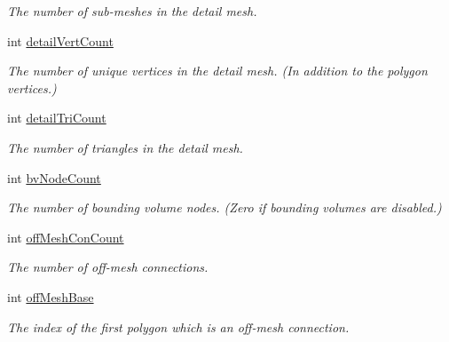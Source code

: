 \begin{DoxyCompactItemize}
\begin{DoxyCompactList}\small\item\em The number of sub-\/meshes in the detail mesh. \end{DoxyCompactList}\item 
\mbox{\label{structdtMeshHeader_abe1c10b7e925b0b31adf72f8f2d1d7e9}} 
int \hyperlink{structdtMeshHeader_abe1c10b7e925b0b31adf72f8f2d1d7e9}{detail\+Vert\+Count}
\begin{DoxyCompactList}\small\item\em The number of unique vertices in the detail mesh. (In addition to the polygon vertices.) \end{DoxyCompactList}\item 
\mbox{\label{structdtMeshHeader_a008cebda05907508cf862d18945d8459}} 
int \hyperlink{structdtMeshHeader_a008cebda05907508cf862d18945d8459}{detail\+Tri\+Count}
\begin{DoxyCompactList}\small\item\em The number of triangles in the detail mesh. \end{DoxyCompactList}\item 
\mbox{\label{structdtMeshHeader_a266e9ad927fe5cbbd3c3c0ffd4e9f5f0}} 
int \hyperlink{structdtMeshHeader_a266e9ad927fe5cbbd3c3c0ffd4e9f5f0}{bv\+Node\+Count}
\begin{DoxyCompactList}\small\item\em The number of bounding volume nodes. (Zero if bounding volumes are disabled.) \end{DoxyCompactList}\item 
\mbox{\label{structdtMeshHeader_af48a70c7ce5f5fd586eb8e66dfe8ea36}} 
int \hyperlink{structdtMeshHeader_af48a70c7ce5f5fd586eb8e66dfe8ea36}{off\+Mesh\+Con\+Count}
\begin{DoxyCompactList}\small\item\em The number of off-\/mesh connections. \end{DoxyCompactList}\item 
\mbox{\label{structdtMeshHeader_ac8f24275024a40076976e024677dc54d}} 
int \hyperlink{structdtMeshHeader_ac8f24275024a40076976e024677dc54d}{off\+Mesh\+Base}
\begin{DoxyCompactList}\small\item\em The index of the first polygon which is an off-\/mesh connection. \end{DoxyCompactList}\item 

\end{DoxyCompactItemize}
